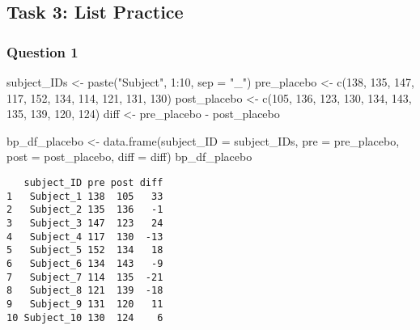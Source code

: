 \documentclass[
  letterpaper,
  DIV=11,
  numbers=noendperiod]{scrartcl}
\newenvironment{Shaded}{\begin{snugshade}}{\end{snugshade}}
\newcommand{\AttributeTok}[1]{\textcolor[rgb]{0.40,0.45,0.13}{#1}}
\newcommand{\DecValTok}[1]{\textcolor[rgb]{0.68,0.00,0.00}{#1}}
\newcommand{\FunctionTok}[1]{\textcolor[rgb]{0.28,0.35,0.67}{#1}}
\newcommand{\NormalTok}[1]{\textcolor[rgb]{0.00,0.23,0.31}{#1}}
\newcommand{\OtherTok}[1]{\textcolor[rgb]{0.00,0.23,0.31}{#1}}
\newcommand{\SpecialCharTok}[1]{\textcolor[rgb]{0.37,0.37,0.37}{#1}}
\newcommand{\StringTok}[1]{\textcolor[rgb]{0.13,0.47,0.30}{#1}}
\begin{document}
\subsection{Task 3: List Practice}\label{task-3-list-practice}

\subsubsection{Question 1}\label{question-1-2}

\begin{Shaded}
\begin{Highlighting}[]
\NormalTok{subject\_IDs }\OtherTok{\textless{}{-}} \FunctionTok{paste}\NormalTok{(}\StringTok{"Subject"}\NormalTok{, }\DecValTok{1}\SpecialCharTok{:}\DecValTok{10}\NormalTok{, }\AttributeTok{sep =} \StringTok{"\_"}\NormalTok{)}
\NormalTok{pre\_placebo }\OtherTok{\textless{}{-}} \FunctionTok{c}\NormalTok{(}\DecValTok{138}\NormalTok{, }\DecValTok{135}\NormalTok{, }\DecValTok{147}\NormalTok{, }\DecValTok{117}\NormalTok{, }\DecValTok{152}\NormalTok{, }\DecValTok{134}\NormalTok{, }\DecValTok{114}\NormalTok{, }\DecValTok{121}\NormalTok{, }\DecValTok{131}\NormalTok{, }\DecValTok{130}\NormalTok{)}
\NormalTok{post\_placebo }\OtherTok{\textless{}{-}} \FunctionTok{c}\NormalTok{(}\DecValTok{105}\NormalTok{, }\DecValTok{136}\NormalTok{, }\DecValTok{123}\NormalTok{, }\DecValTok{130}\NormalTok{, }\DecValTok{134}\NormalTok{, }\DecValTok{143}\NormalTok{, }\DecValTok{135}\NormalTok{, }\DecValTok{139}\NormalTok{, }\DecValTok{120}\NormalTok{, }\DecValTok{124}\NormalTok{)}
\NormalTok{diff }\OtherTok{\textless{}{-}}\NormalTok{ pre\_placebo }\SpecialCharTok{{-}}\NormalTok{ post\_placebo}

\NormalTok{bp\_df\_placebo }\OtherTok{\textless{}{-}} \FunctionTok{data.frame}\NormalTok{(}\AttributeTok{subject\_ID =}\NormalTok{ subject\_IDs, }\AttributeTok{pre =}\NormalTok{ pre\_placebo, }\AttributeTok{post =}\NormalTok{ post\_placebo, }\AttributeTok{diff =}\NormalTok{ diff)}
\NormalTok{bp\_df\_placebo}
\end{Highlighting}
\end{Shaded}

\begin{verbatim}
   subject_ID pre post diff
1   Subject_1 138  105   33
2   Subject_2 135  136   -1
3   Subject_3 147  123   24
4   Subject_4 117  130  -13
5   Subject_5 152  134   18
6   Subject_6 134  143   -9
7   Subject_7 114  135  -21
8   Subject_8 121  139  -18
9   Subject_9 131  120   11
10 Subject_10 130  124    6
\end{verbatim}
\end{document}
